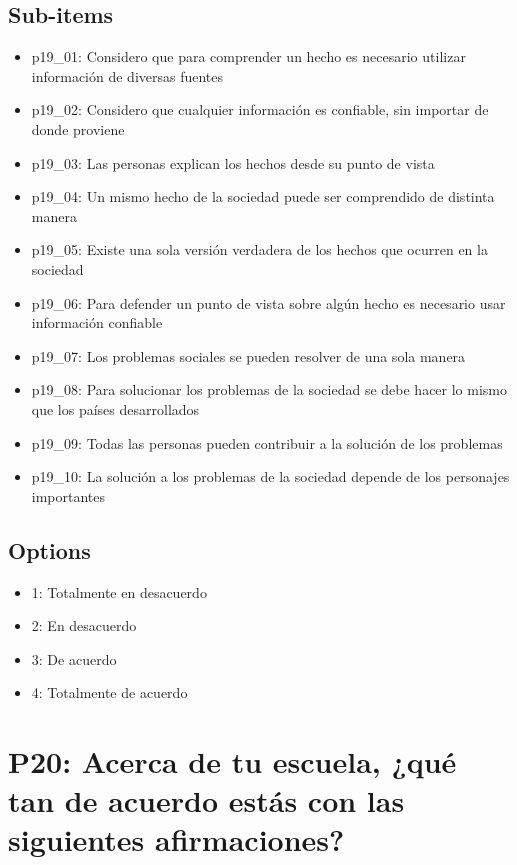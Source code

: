 \documentclass[11pt]{article}
\begin{document}
\subsection*{Sub-items}
\begin{itemize}[leftmargin=*]
  \item p19\_01: Considero que para comprender un hecho es necesario utilizar información de diversas fuentes
  \item p19\_02: Considero que cualquier información es confiable, sin importar de donde proviene
  \item p19\_03: Las personas explican los hechos desde su punto de vista
  \item p19\_04: Un mismo hecho de la sociedad puede ser comprendido de distinta manera
  \item p19\_05: Existe una sola versión verdadera de los hechos que ocurren en la sociedad
  \item p19\_06: Para defender un punto de vista sobre algún hecho es necesario usar información confiable
  \item p19\_07: Los problemas sociales se pueden resolver de una sola manera
  \item p19\_08: Para solucionar los problemas de la sociedad se debe hacer lo mismo que los países desarrollados
  \item p19\_09: Todas las personas pueden contribuir a la solución de los problemas
  \item p19\_10: La solución a los problemas de la sociedad depende de los personajes importantes
\end{itemize}
\subsection*{Options}
\begin{itemize}[leftmargin=*]
  \item 1: Totalmente en desacuerdo
  \item 2: En desacuerdo
  \item 3: De acuerdo
  \item 4: Totalmente de acuerdo
\end{itemize}
\bigskip
\section*{P20: Acerca de tu escuela, ¿qué tan de acuerdo estás con las siguientes afirmaciones?}
\end{document}
